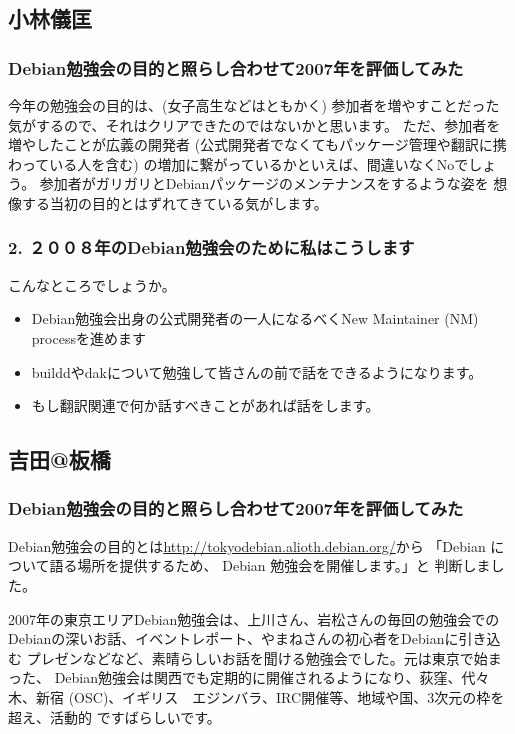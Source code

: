 \documentclass[mingoth,a4paper]{jsarticle}
\begin{document}
\subsection{小林儀匡}

\subsubsection{ Debian勉強会の目的と照らし合わせて2007年を評価してみた}
今年の勉強会の目的は、(女子高生などはともかく) 参加者を増やすことだった気がするので、それはクリアできたのではないかと思います。
ただ、参加者を増やしたことが広義の開発者 (公式開発者でなくてもパッケージ管理や翻訳に携わっている人を含む) の増加に繋がっているかといえば、間違いなくNoでしょう。
参加者がガリガリとDebianパッケージのメンテナンスをするような姿を
想像する当初の目的とはずれてきている気がします。

\subsubsection{2. ２００８年のDebian勉強会のために私はこうします}
こんなところでしょうか。
\begin{itemize}
 \item  Debian勉強会出身の公式開発者の一人になるべくNew Maintainer (NM) processを進めます
 \item  builddやdakについて勉強して皆さんの前で話をできるようになります。
 \item  もし翻訳関連で何か話すべきことがあれば話をします。
\end{itemize}

\subsection{吉田@板橋}

\subsubsection{Debian勉強会の目的と照らし合わせて2007年を評価してみた}

Debian勉強会の目的とは\url{http://tokyodebian.alioth.debian.org/}から
「Debian について語る場所を提供するため、 Debian 勉強会を開催します。」と
判断しました。

2007年の東京エリアDebian勉強会は、上川さん、岩松さんの毎回の勉強会での
Debianの深いお話、イベントレポート、やまねさんの初心者をDebianに引き込む
プレゼンなどなど、素晴らしいお話を聞ける勉強会でした。元は東京で始まった、
Debian勉強会は関西でも定期的に開催されるようになり、荻窪、代々木、新宿
(OSC)、イギリス　エジンバラ、IRC開催等、地域や国、3次元の枠を超え、活動的
ですばらしいです。
\end{document}
